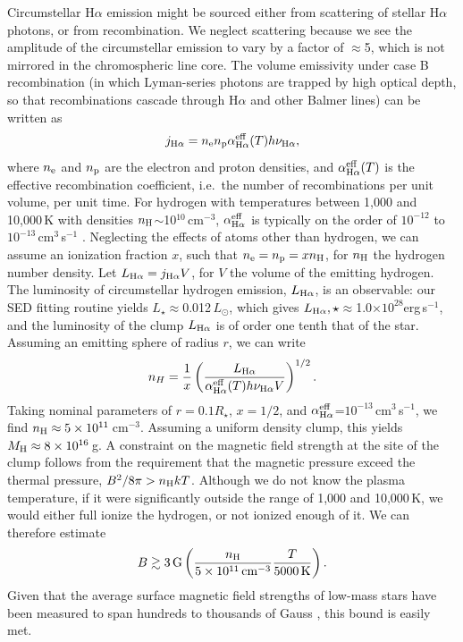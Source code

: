 \documentclass{nature3}
\begin{document}
\begin{methods}
Circumstellar H$\alpha$ emission might be sourced either from
scattering of stellar H$\alpha$ photons, or from recombination.  We
neglect scattering because we see the amplitude of the circumstellar
emission to vary by a factor of $\approx$5, which is not mirrored in
the chromospheric line core.  The volume emissivity under case B
recombination (in which Lyman-series photons are trapped by high
optical depth, so that recombinations cascade through H$\alpha$ and
other Balmer lines) can be written as
\begin{equation}
  j_{\rm H\alpha} = n_{\rm e} n_{\rm p} \alpha^{\rm eff}_{\rm H\alpha}(T) h \nu_{\rm H\alpha},
\end{equation}
where $n_{\rm e}$ and $n_{\rm p}$ are the electron and proton densities,
and $\alpha^{\rm eff}_{\rm H\alpha}(T)$ is the effective recombination
coefficient, i.e.\ the number of recombinations per unit volume, per
unit time.
For hydrogen with temperatures between 1,000 and 10,000\,K with
densities $n_{\rm H}$$\sim$10$^{10}$\,cm$^{-3}$,
$\alpha^{\rm eff}_{\rm H\alpha}$ is typically on the order of $10^{-12}$ to
$10^{-13}$\,cm$^3$\,s$^{-1}$ \cite{Hummer1987}.
Neglecting the effects of atoms other than hydrogen, we can assume
an ionization fraction $x$, such that $n_{\rm e} = n_{\rm p} = x
n_{\rm H}$, for $n_{\rm H}$ the hydrogen number density.  Let $L_{\rm
H\alpha} = j_{\rm H\alpha} V$, for $V$ the volume of the emitting
hydrogen.
The luminosity of circumstellar hydrogen emission, $L_{\rm H\alpha}$,
is an observable: our SED fitting routine yields
$L_\star$$\approx$0.012\,$L_\odot$, which gives
$L_{\rm H\alpha},\star$$\approx$1.0$\times$$10^{28}$erg\,s$^{-1}$, and
the luminosity of the clump $L_{\rm H\alpha}$ is of order one tenth
that of the star.
Assuming an emitting sphere of radius $r$, we can write
\begin{equation}
  n_H = \frac{1}{x}
  \left( 
    \frac{L_{\rm H\alpha}}{ \alpha^{\rm eff}_{\rm H\alpha}(T) h \nu_{\rm H\alpha} V }
  \right)^{1/2}.
\end{equation}
Taking nominal parameters of $r = 0.1 R_\star$, $x=1/2$, and
$\alpha^{\rm eff}_{\rm H\alpha}$=$10^{-13}$\,cm$^3$\,s$^{-1}$,
we find $n_{\rm H}\approx 5\times10^{11}$\,cm$^{-3}$.
Assuming a uniform density clump, this yields $M_{\rm H}\approx
8\times10^{16}$\,g.
A constraint on the magnetic field strength at the site of the clump
follows from the requirement that the magnetic pressure exceed the
thermal pressure, $B^2 / 8\pi > n_{\rm H} k T$.
Although we do not know the plasma temperature,
if it were significantly outside the range of
1,000 and 10,000\,K,
we would either full ionize the hydrogen, or not ionized enough of it.
We can therefore estimate
\begin{equation}
  B \gtrsim 3\,{\rm G}
  \left(
  \frac{n_{\rm H}}{5\times10^{11}\,{\rm cm}^{-3}}
  \frac{T}{5000\,{\rm K}}
  \right).
\end{equation}
Given that the average surface magnetic field strengths of low-mass
stars have been measured to span hundreds to thousands of Gauss
\cite{Kochukhov2021}, this bound is easily met.


\end{methods}
\end{document}
